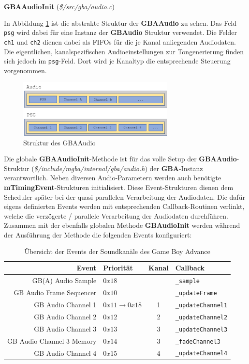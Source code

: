 \documentclass[11pt,a4paper]{scrartcl}
\newcommand{\paratitlecode}[2] {
    \vspace{5mm}
    \large \textbf{#1} \normalsize(\textit{\${#2}})
    \vspace{2mm}\newline
}
\begin{document}
\newpage
\paratitlecode{GBAAudioInit}{/src/gba/audio.c}
In Abbildung \ref{fig:gbaaudio} ist die abstrakte Struktur der \textbf{GBAAudio} zu sehen. Das Feld \verb|psg| wird dabei f\"ur eine Instanz der \textbf{GBAudio} Struktur verwendet. Die Felder \verb|ch1| und \verb|ch2| dienen dabei als FIFOs f\"ur die je Kanal anliegenden Audiodaten. Die eigentlichen, kanalspezifischen Audioeinstellungen zur Tongenerierung finden sich jedoch im \verb|psg|-Feld. Dort wird je Kanaltyp die entsprechende Steuerung vorgenommen.

\begin{figure}[h]
    \centering
    \includegraphics[width=0.7\textwidth]{Emulator_Audio}
    \caption{Struktur des GBAAudio}
    \label{fig:gbaaudio}
\end{figure}

Die globale \textbf{GBAAudioInit}-Methode ist f\"ur das volle Setup der \textbf{GBAAudio}-Struktur (\textit{\$/include/mgba/internal/gba/audio.h}) der \textbf{GBA}-Instanz verantwortlich. Neben diversen Audio-Parametern werden auch ben\"otigte \textbf{mTimingEvent}-Strukturen initialisiert. Diese Event-Strukturen dienen dem Scheduler sp\"ater bei der quasi-parallelen Verarbeitung der Audiodaten. Die daf\"ur eigens definierten Events werden mit entsprechenden Callback-Routinen verlinkt, welche die verz\"ogerte / parallele Verarbeitung der Audiodaten durchf\"uhren. Zusammen mit der ebenfalls globalen Methode \textbf{GBAudioInit} werden w\"ahrend der Ausf\"uhrung der Methode die folgenden Events konfiguriert:

\begin{table}[h]
    \centering
    \begin{tabular}{ r | p{3cm} | c | p{7cm} }
        \textbf{Event} & \textbf{Priorit\"at} & \textbf{Kanal} & \textbf{Callback} \\
        \hline
        GB(A) Audio Sample & $0x18$ & & \verb|_sample| \\
        \hline
        GB  Audio Frame Sequencer & $0x10$ & & \verb|_updateFrame| \\
        \hline
        GB Audio Channel 1 & $0x11 \rightarrow 0x18$ & 1 & \verb|_updateChannel1|  \\
        \hline
        GB Audio Channel 2 & $0x12$ & 2 & \verb|_updateChannel2| \\
        \hline
        GB Audio Channel 3 & $0x13$ & 3 & \verb|_updateChannel3| \\
        \hline
        GB Audio Channel 3 Memory & $0x14$ & 3 & \verb|_fadeChannel3| \\
        \hline
        GB Audio Channel 4 & $0x15$ & 4 & \verb|_updateChannel4| \\
    \end{tabular}
    \caption{\"Ubersicht der Events der Soundkan\"ale des Game Boy Advance}
    \label{table:SoundEvents}
\end{table}
\end{document}
